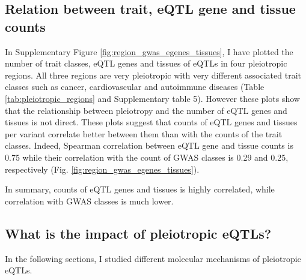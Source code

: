\subsection*{Relation between trait, eQTL gene and tissue counts}
%

In Supplementary Figure \ref{fig:region_gwas_egenes_tissues}, I have plotted the number of trait classes, eQTL genes and tissues of
eQTLs in four pleiotropic regions.
%
All three regions are very pleiotropic with very different associated trait classes such as cancer, cardiovascular and
autoimmune diseases (Table \ref{tab:pleiotropic_regions} and Supplementary table 5).
%
However these plots show that the relationship between pleiotropy and the number of eQTL genes and tissues is not direct.
%
These plots suggest that counts of eQTL genes and tissues per variant correlate better between them than with the counts of the trait classes.
%
Indeed, Spearman correlation between eQTL gene and tissue counts is 0.75 while their correlation with the count of GWAS classes is 0.29 and 0.25, respectively (Fig. \ref{fig:region_gwas_egenes_tissues}).

In summary, counts of eQTL genes and tissues is highly correlated, while correlation with GWAS classes is much lower.

%
\subsection*{What is the impact of pleiotropic eQTLs?}
%


In the following sections, I studied different molecular mechanisms of pleiotropic eQTLs.
%

